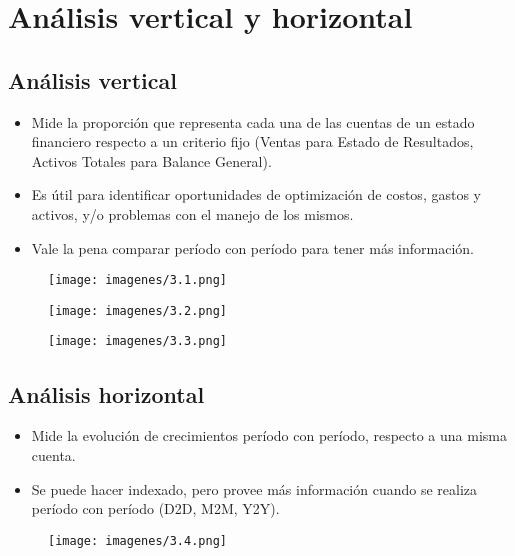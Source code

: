 \section{Análisis vertical y horizontal}

\subsection{Análisis vertical}

\begin{itemize}
    \item Mide la proporción que representa cada una de las cuentas de un estado 
    financiero respecto a un criterio fijo (Ventas para Estado de Resultados, Activos Totales 
    para Balance General). 
    \item Es útil para identificar oportunidades de optimización de costos, gastos y 
    activos, y/o problemas con el manejo de los mismos. 
    \item Vale la pena comparar período con período para tener más información. 
\end{itemize}
\begin{figure}[H]
    \centering
    \texttt{[image: imagenes/3.1.png]}
\end{figure}

\begin{figure}[H]
    \centering
    \texttt{[image: imagenes/3.2.png]}
\end{figure}

\begin{figure}[H]
    \centering
    \texttt{[image: imagenes/3.3.png]}
\end{figure}



\subsection{Análisis horizontal}
\begin{itemize}
    \item Mide la evolución de crecimientos período con período, respecto a una misma cuenta. 
    \item Se  puede  hacer  indexado,  pero  provee  más  información  cuando  se 
    realiza período con período (D2D, M2M, Y2Y).
\end{itemize}

\begin{figure}[H]
    \centering
    \texttt{[image: imagenes/3.4.png]}
\end{figure}


%
%

